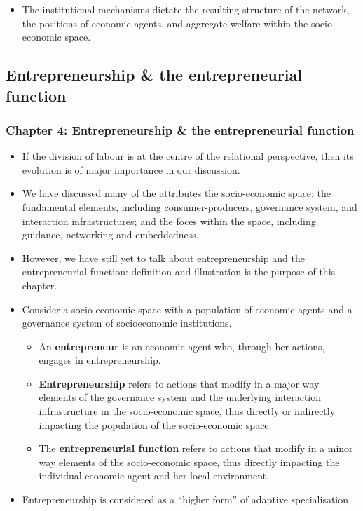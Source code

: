 \documentclass[10pt]{beamer}
\begin{document}
\begin{frame} %
\begin{itemize}
\item The institutional mechanisms dictate the resulting structure of the network, the positions of economic agents, and aggregate welfare within the socio-economic space.
\end{itemize}
\end{frame}

\subsection{Entrepreneurship \& the entrepreneurial function}

\begin{frame} \frametitle{Chapter 4: Entrepreneurship \& the entrepreneurial function}
\begin{itemize}
\item If the division of labour is at the centre of the relational perspective, then its evolution is of major importance in our discussion.
\medskip
\item We have discussed many of the attributes the socio-economic space: the fundamental elements, including consumer-producers, governance system, and interaction infrastructures; and the foces within the space, including guidance, networking and embeddedness.
\medskip
\item However, we have still yet to talk about entrepreneurship and the entrepreneurial function: definition and illustration is the purpose of this chapter.
\end{itemize}
\end{frame}


\begin{frame}
\begin{itemize}
\item Consider a socio-economic space with a population of economic agents and a governance system of socioeconomic institutions.
\begin{itemize}
\medskip
\item An \textbf{entrepreneur} is an economic agent who, through her actions, engages in entrepreneurship.
\medskip
\item \textbf{Entrepreneurship} refers to actions that modify in a major way elements of the governance system and the underlying interaction infrastructure in the socio-economic space, thus directly or indirectly impacting the population of the socio-economic space.
\medskip
\item The \textbf{entrepreneurial function} refers to actions that modify in a minor way elements of the socio-economic space, thus directly impacting the individual economic agent and her local environment.
\end{itemize}
\medskip
\item Entrepreneurship is considered as a ``higher form'' of adaptive specialisation
\end{itemize}
\end{frame}
\end{document}
